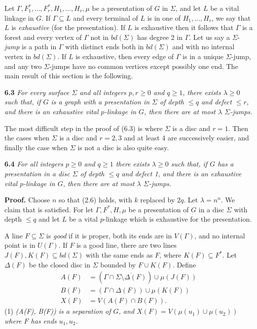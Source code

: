 Let $\Gamma, F_1^*, \ldots, F_r^*, H_1, \ldots, H_r, \mu$ be a presentation of $G$ in $\Sigma$, and let $L$ be a vital linkage in $G$. If $\Gamma \subseteq L$ and every terminal of $L$ is in one of $H_1, \ldots, H_r$, we say that $L$ is \textit{exhaustive} (for the presentation). If $L$ is exhaustive then it follows that $\Gamma$ is a forest and every vertex of $\Gamma$ not in $bd(\Sigma)$ has degree 2 in $\Gamma$. Let us say a $\Sigma$-\textit{jump} is a path in $\Gamma$ with distinct ends both in $bd(\Sigma)$ and with no internal vertex in $bd(\Sigma)$. If $L$ is exhaustive, then every edge of $\Gamma$ is in a unique $\Sigma$-jump, and any two $\Sigma$-jumps have no common vertices except possibly one end. The main result of this section is the following.

\textbf{6.3} \textit{For every surface $\Sigma$ and all integers $p, r \ge 0$ and $q \ge 1$, there exists $\lambda \ge 0$ such that, if $G$ is a graph with a presentation in $\Sigma$ of depth $\le q$ and defect $\le r$, and there is an exhaustive vital $p$-linkage in $G$, then there are at most $\lambda$ $\Sigma$-jumps.}

The most difficult step in the proof of (6.3) is where $\Sigma$ is a disc and $r = 1$. Then the cases when $\Sigma$ is a disc and $r = 2, 3$ and at least 4 are successively easier, and finally the case when $\Sigma$ is not a disc is also quite easy.

\textbf{6.4} \textit{For all integers $p \ge 0$ and $q \ge 1$ there exists $\lambda \ge 0$ such that, if $G$ has a presentation in a disc $\Sigma$ of depth $\le q$ and defect 1, and there is an exhaustive vital $p$-linkage in $G$, then there are at most $\lambda$ $\Sigma$-jumps.}

\textbf{Proof.} Choose $n$ so that (2.6) holds, with $k$ replaced by $2q$. Let $\lambda = n^n$. We claim that  is satisfied. For let $\Gamma, F^*, H, \mu$ be a presentation of $G$ in a disc $\Sigma$ with depth $\le q$ and let $L$ be a vital $p$-linkage which is exhaustive for the presentation.

A line $F \subseteq \Sigma$ is \textit{good} if it is proper, both its ends are in $V(\Gamma)$, and no internal point is in $U(\Gamma)$. If $F$ is a good line, there are two lines $J(F), K(F) \subseteq bd(\Sigma)$ with the same ends as $F$, where $K(F) \subseteq F^*$. Let $\Delta(F)$ be the closed disc in $\Sigma$ bounded by $F \cup K(F)$. Define
\begin{align*}
A(F) &= (\Gamma \cap \overline{\Sigma \setminus \Delta(F)}) \cup \mu(J(F)) \\
B(F) &= (\Gamma \cap \Delta(F)) \cup \mu(K(F)) \\
X(F) &= V(A(F) \cap B(F)).
\end{align*}
\hspace*{12pt}(1) \textit{(A(F), B(F)) is a separation of $G$, and $X(F) = V(\mu(u_1) \cup \mu(u_2))$ where $F$ has ends $u_1, u_2$.}


